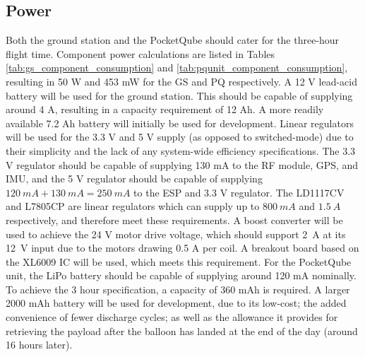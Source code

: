 \subsection{Power}
Both the ground station and the PocketQube should cater for the three-hour flight time. Component power calculations are listed in Tables \ref{tab:gs_component_consumption} and \ref{tab:pqunit_component_consumption}, resulting in 50 W and 453 mW for the GS and PQ respectively. A 12 V lead-acid battery will be used for the ground station. This should be capable of supplying around 4 A, resulting in a capacity requirement of 12 Ah. A more readily available 7.2 Ah battery will initially be used for development. Linear regulators will be used for the 3.3 V and 5 V supply (as opposed to switched-mode) due to their simplicity and the lack of any system-wide efficiency specifications. The 3.3 V regulator should be capable of supplying 130 mA to the RF module, GPS, and IMU, and the 5 V regulator should be capable of supplying $\SI{120}{mA} + \SI{130}{mA} = \SI{250}{mA}$ to the ESP and 3.3 V regulator. The LD1117CV and L7805CP are linear regulators which can supply up to $\SI{800}{mA}$ and $\SI{1.5}{A}$ respectively, and therefore meet these requirements. A boost converter will be used to achieve the 24 V motor drive voltage, which should support \SI{2}{A} at its \SI{12}{V} input due to the motors drawing 0.5 A per coil. A breakout board based on the XL6009 IC will be used, which meets this requirement. For the PocketQube unit, the LiPo battery should be capable of supplying around 120 mA nominally. To achieve the 3 hour specification, a capacity of 360 mAh is required. A larger 2000 mAh battery will be used for development, due to its low-cost; the added convenience of fewer discharge cycles; as well as the allowance it provides for retrieving the payload after the balloon has landed at the end of the day (around 16 hours later).